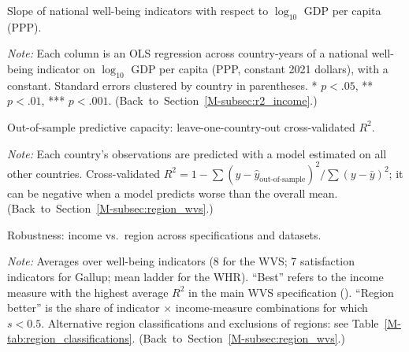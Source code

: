 \documentclass[12pt]{article}
\begin{document}
\begin{table}[htbp]
    \centering
    \begin{adjustbox}{max width=\textwidth}
    
    \end{adjustbox}
    \caption{Slope of national well-being indicators with respect to $\log_{10}$ GDP per capita (PPP).}\label{tab:slopes}
    \begin{minipage}{\textwidth}\footnotesize \textit{Note:} Each column is an OLS regression across country-years of a national well-being indicator on $\log_{10}$ GDP per capita (PPP, constant 2021 dollars), with a constant. Standard errors clustered by country in parentheses. * $p<.05$, ** $p<.01$, *** $p<.001$. \hfill(Back~to~Section~\ref{M-subsec:r2_income}.)\end{minipage}
\end{table}

\begin{table}[htbp]
    \centering
    \begin{adjustbox}{max width=\textwidth}
    
    \end{adjustbox}
    \caption{Out-of-sample predictive capacity: leave-one-country-out cross-validated $R^2$.}\label{tab:cv}
    \begin{minipage}{\textwidth}\footnotesize \textit{Note:} Each country's observations are predicted with a model estimated on all other countries. Cross-validated $R^2 = 1 - \sum (y - \hat y_{\text{out-of-sample}})^2 / \sum (y - \bar y)^2$; it can be negative when a model predicts worse than the overall mean. \hfill(Back~to~Section~\ref{M-subsec:region_wvs}.)\end{minipage}
\end{table}

\begin{table}[htbp]
    \centering
    \begin{adjustbox}{max width=\textwidth}
    
    \end{adjustbox}
    \caption{Robustness: income vs.\ region across specifications and datasets.}\label{tab:robustness}
    \begin{minipage}{\textwidth}\footnotesize \textit{Note:} Averages over well-being indicators (8 for the WVS; 7 satisfaction indicators for Gallup; mean ladder for the WHR). ``Best'' refers to the income measure with the highest average $R^2$ in the main WVS specification (\bestIncome). ``Region better'' is the share of indicator $\times$ income-measure combinations for which $s < 0.5$. Alternative region classifications and exclusions of regions: see Table~\ref{M-tab:region_classifications}. \hfill(Back~to~Section~\ref{M-subsec:region_wvs}.)\end{minipage}
\end{table}
\end{document}
